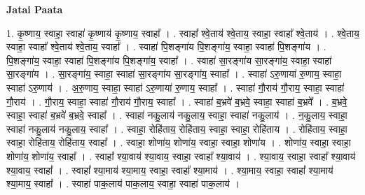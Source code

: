 \documentclass[17pt]{extarticle}
\begin{document}
\textbf{Jatai Paata} \newline

1. कृ॒ष्णाय॒ स्वाहा॒ स्वाहा॑ कृ॒ष्णाय॑ कृ॒ष्णाय॒ स्वाहा᳚ । . स्वाहा᳚ श्वे॒ताय॑ श्वे॒ताय॒ स्वाहा॒ स्वाहा᳚ श्वे॒ताय॑ । . श्वे॒ताय॒ स्वाहा॒ स्वाहा᳚ श्वे॒ताय॑ श्वे॒ताय॒ स्वाहा᳚ । . स्वाहा॑ पि॒शङ्गा॑य पि॒शङ्गा॑य॒ स्वाहा॒ स्वाहा॑ पि॒शङ्गा॑य । . पि॒शङ्गा॑य॒ स्वाहा॒ स्वाहा॑ पि॒शङ्गा॑य पि॒शङ्गा॑य॒ स्वाहा᳚ । . स्वाहा॑ सा॒रङ्गा॑य सा॒रङ्गा॑य॒ स्वाहा॒ स्वाहा॑ सा॒रङ्गा॑य । . सा॒रङ्गा॑य॒ स्वाहा॒ स्वाहा॑ सा॒रङ्गा॑य सा॒रङ्गा॑य॒ स्वाहा᳚ । . स्वाहा॑ ऽरु॒णाया॑ रु॒णाय॒ स्वाहा॒ स्वाहा॑ ऽरु॒णाय॑ । . अ॒रु॒णाय॒ स्वाहा॒ स्वाहा॑ ऽरु॒णाया॑ रु॒णाय॒ स्वाहा᳚ । . स्वाहा॑ गौ॒राय॑ गौ॒राय॒ स्वाहा॒ स्वाहा॑ गौ॒राय॑ । . गौ॒राय॒ स्वाहा॒ स्वाहा॑ गौ॒राय॑ गौ॒राय॒ स्वाहा᳚ । . स्वाहा॑ ब॒भ्रवे॑ ब॒भ्रवे॒ स्वाहा॒ स्वाहा॑ ब॒भ्रवे᳚ । . ब॒भ्रवे॒ स्वाहा॒ स्वाहा॑ ब॒भ्रवे॑ ब॒भ्रवे॒ स्वाहा᳚ । . स्वाहा॑ नकु॒लाय॑ नकु॒लाय॒ स्वाहा॒ स्वाहा॑ नकु॒लाय॑ । . न॒कु॒लाय॒ स्वाहा॒ स्वाहा॑ नकु॒लाय॑ नकु॒लाय॒ स्वाहा᳚ । . स्वाहा॒ रोहि॑ताय॒ रोहि॑ताय॒ स्वाहा॒ स्वाहा॒ रोहि॑ताय । . रोहि॑ताय॒ स्वाहा॒ स्वाहा॒ रोहि॑ताय॒ रोहि॑ताय॒ स्वाहा᳚ । . स्वाहा॒ शोणा॑य॒ शोणा॑य॒ स्वाहा॒ स्वाहा॒ शोणा॑य । . शोणा॑य॒ स्वाहा॒ स्वाहा॒ शोणा॑य॒ शोणा॑य॒ स्वाहा᳚ । . स्वाहा᳚ श्या॒वाय॑ श्या॒वाय॒ स्वाहा॒ स्वाहा᳚ श्या॒वाय॑ । . श्या॒वाय॒ स्वाहा॒ स्वाहा᳚ श्या॒वाय॑ श्या॒वाय॒ स्वाहा᳚ । . स्वाहा᳚ श्या॒माय॑ श्या॒माय॒ स्वाहा॒ स्वाहा᳚ श्या॒माय॑ । . श्या॒माय॒ स्वाहा॒ स्वाहा᳚ श्या॒माय॑ श्या॒माय॒ स्वाहा᳚ । . स्वाहा॑ पाक॒लाय॑ पाक॒लाय॒ स्वाहा॒ स्वाहा॑ पाक॒लाय॑ । \newline
\end{document}

